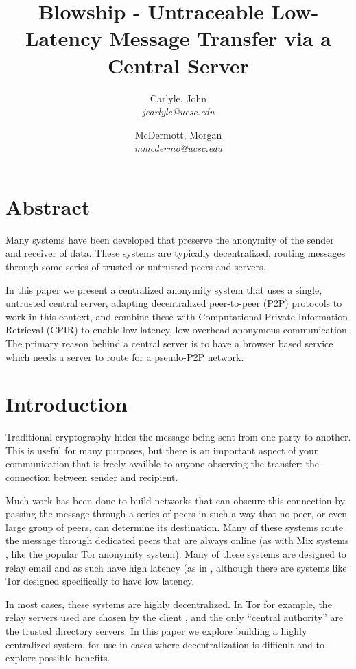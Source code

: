 \documentclass[twocolumn,11pt,english]{article}
\title{Blowship - Untraceable Low-Latency Message Transfer via a Central Server}
\date{}
\author{
  Carlyle, John\\
  \textit{jcarlyle@ucsc.edu}
  \and
  McDermott, Morgan\\
  \textit{mmcdermo@ucsc.edu}
}
\begin{document}
\maketitle

\section*{Abstract} 
Many systems have been developed that preserve the anonymity of the sender and receiver of data. These systems are typically decentralized, routing messages through some series of trusted or untrusted peers and servers. 

In this paper we present a centralized anonymity system that uses a single, untrusted central server, adapting decentralized peer-to-peer (P2P) protocols to work in this context, and combine these with Computational Private Information Retrieval (CPIR) to enable low-latency, low-overhead anonymous communication. The primary reason behind a central server is to have a browser based service which needs a server to route for a pseudo-P2P network.

\section{Introduction}

Traditional cryptography hides the message being sent from one party to another. This is useful for many purposes, but there is an important aspect of your communication that is freely availble to anyone observing the transfer: the connection between sender and recipient. 

Much work has been done to build networks that can obscure this connection by passing the message through a series of peers in such a way that no peer, or even large group of peers, can determine its destination. Many of these systems route the message through dedicated peers that are always online (as with Mix systems \cite{chaum-mix}, like the popular Tor\cite{tor-design} anonymity system). Many of these systems are designed to relay email and as such have high latency (as in \cite{minion-design}, although there are systems like Tor designed specifically to have low latency. 

In most cases, these systems are highly decentralized. In Tor for example, the relay servers used are chosen by the client \cite{tor-design}, and the only ``central authority'' are the trusted directory servers. In this paper we explore building a highly centralized system, for use in cases where decentralization is difficult and to explore possible benefits. 
\end{document}
